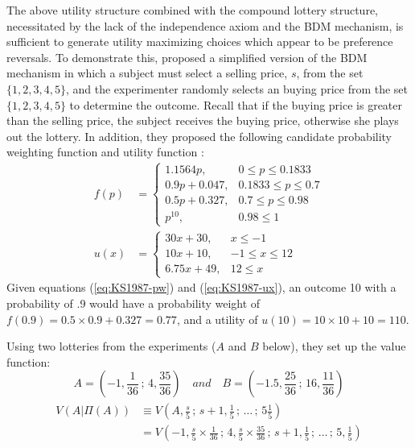 \documentclass[../main.tex]{subfiles}
\begin{document}
The above utility structure combined with the compound lottery structure, necessitated by the lack of the independence axiom and the BDM mechanism, is sufficient to generate utility maximizing choices which appear to be preference reversals. To demonstrate this, \textcite{Karni1987} proposed a simplified version of the BDM mechanism in which a subject must select a selling price, $s$, from the set $\lbrace 1,2,3,4,5\rbrace$, and the experimenter randomly selects an buying price from the set $\lbrace 1,2,3,4,5 \rbrace$ to determine the outcome.
Recall that if the buying price is greater than the selling price, the subject receives the buying price, otherwise she plays out the lottery.
In addition, they proposed the following candidate probability weighting function and utility function :
\begin{align}
	f(p) &= 
	\begin{cases} 
		1.1564 p,     & 0 \leq p \leq 0.1833 \\
		0.9p + 0.047, & 0.1833 \leq p \leq 0.7 \\
		0.5p + 0.327, & 0.7 \leq p \leq 0.98 \\
		p^{10},       & 0.98 \leq 1
	\end{cases}\label{eq:KS1987-pw}\\
	u(x) &= 
	\begin{cases} 
		30x + 30,     & x \leq -1 \\
		10x + 10,     & -1 \leq x \leq 12 \\
		6.75x + 49,   & 12 \leq x
	\end{cases}\label{eq:KS1987-ux}
\end{align}
\noindent Given equations (\ref{eq:KS1987-pw}) and (\ref{eq:KS1987-ux}), an outcome 10 with a probability of .9 would have a probability weight of $f(0.9) = 0.5\times0.9 + 0.327 = 0.77$, and a utility of $u(10) = 10 \times 10 + 10 = 110$.

Using two lotteries from the \textcite{Grether1979} experiments ($A$ and $B$ below), they set up the value function:
\begin{equation}
	\label{eq:KS1987-Alot}
	A = ( -1, \frac{1}{36} \,;\, 4, \frac{35}{36}) \quad \textit{and} \quad B=(-1.5, \frac{25}{36} \,;\, 16, \frac{11}{36})
\end{equation}
\begin{align}
	\label{eq:KS1987-VA}
	\begin{split}
		V(A|\Pi(A)) &\equiv V \left( A,\frac{s}{5} \,;\, s+1, \frac{1}{5} \,;\, \ldots \,;\, 5 \frac{1}{5} \right)\\
		            &=      V \left(-1,\frac{s}{5} \times \frac{1}{36} \,;\, 4, \frac{s}{5}\times \frac{35}{36} \,;\, s+1, \frac{1}{5} \,;\, \ldots \,;\, 5,\frac{1}{5}  \right)
	\end{split}
\end{align}
\end{document}
